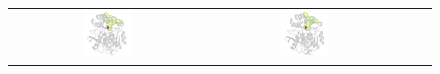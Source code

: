 \documentclass[usletter, 10pt, conference]{svjour3}      %
\begin{document}
\begin{figure}
\centering
{
\def\ee{0.26}
\renewcommand{\tabcolsep}{-1pt}
\begin{tabular}{cccc}
\includegraphics[width=\ee\textwidth]{fig/video-0560} &
\includegraphics[width=\ee\textwidth]{fig/video-0561} &

\end{tabular}}
\end{figure}
\end{document}
